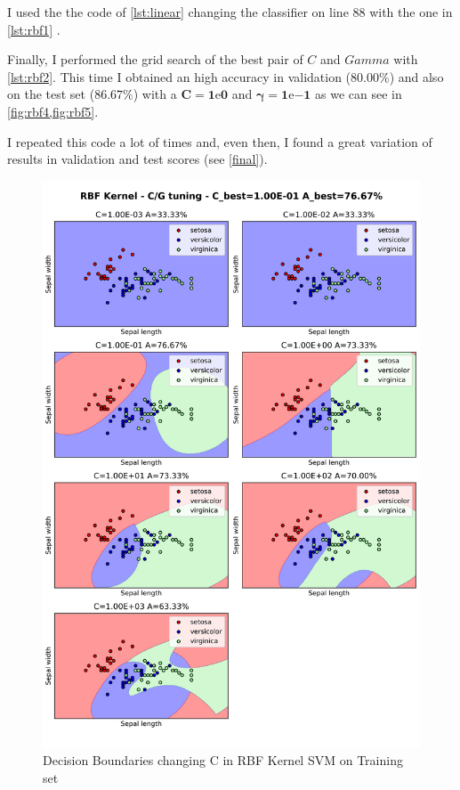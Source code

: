 \documentclass[a4paper, 11pt]{article}
\begin{document}
	I used the the code of \vref{lst:linear} changing the classifier on line $88$ with the one in \vref{lst:rbf1} .
	
	
	
	Finally, I performed the grid search of the best pair of $C$ and $Gamma$ with \vref{lst:rbf2}. This time I obtained an high accuracy in validation ($\boldsymbol{80.00\%}$) and also on the test set ($\boldsymbol{86.67\%}$) with a $\boldsymbol{C=1\mathrm{e}{0}}$ and $\boldsymbol{\gamma=1\mathrm{e}{-1}}$ as we can see in \vref{fig:rbf4,fig:rbf5}.
	
	
	
	I repeated this code a lot of times and, even then, I found a great variation of results in validation and test scores (see \vref{final}).
	
	\begin{figure}[ht!]
		\centering
		\includegraphics[height=0.8\paperheight]{img/fig02a.png}
		\caption{Decision Boundaries changing C in RBF Kernel SVM on Training set}
		\label{fig:rbf1}
	\end{figure}
	
\end{document}
